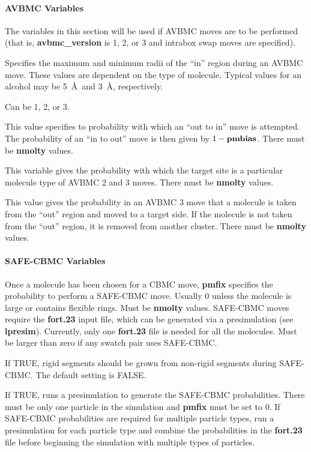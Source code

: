 \documentclass[12pt,letterpaper]{article}
\begin{document}
\paragraph{AVBMC Variables}
\label{avbmc_vars}

The variables in this section will be used if AVBMC moves
are to be performed (that is, {\bf avbmc\_version} is 1, 2,
or 3 and intrabox swap moves are specified).

 Specifies the maximum and
minimum radii of the ``in'' region during an AVBMC move.
These values are dependent on the type of molecule. Typical
values for an alcohol may be 5~\AA~and 3~\AA, respectively.

 Can be 1, 2, or 3.

 This value specifies to probability
with which an ``out to in'' move is attempted. The
probability of an ``in to out'' move is then given by $1 -
{\bf pmbias}$. There must be {\bf nmolty} values.

 This variable gives the probability
with which the target site is a particular molecule type of
AVBMC 2 and 3 moves. There must be {\bf nmolty} values.

 This value gives the probability in
an AVBMC 3 move that a molecule is taken from the ``out''
region and moved to a target side. If the molecule is not
taken from the ``out'' region, it is removed from another
cluster. There must be {\bf nmolty} values.

\paragraph{SAFE-CBMC Variables}

 Once a molecule has been chosen for a
CBMC move, {\bf pmfix} specifies the probability to perform
a SAFE-CBMC move. Usually 0 unless the molecule is large or
contains flexible rings. Must be {\bf nmolty} values.
SAFE-CBMC moves require the {\bf fort.23} input file, which
can be generated via a presimulation (see {\bf lpresim}). 
Currently, only one {\bf fort.23} file is needed for 
all the molecules.
Must be larger than zero if any swatch pair uses SAFE-CBMC.

 If TRUE, rigid segments should be grown
from non-rigid segments during SAFE-CBMC. The default
setting is FALSE.

 If TRUE, runs a presimulation to
generate the SAFE-CBMC probabilities. There must be only one
particle in the simulation and {\bf pmfix} must be set to 0.
If SAFE-CBMC probabilities are required for multiple
particle types, run a presimulation for each particle type
and combine the probabilities in the {\bf fort.23} file
before beginning the simulation with multiple types of
particles.
\end{document}
